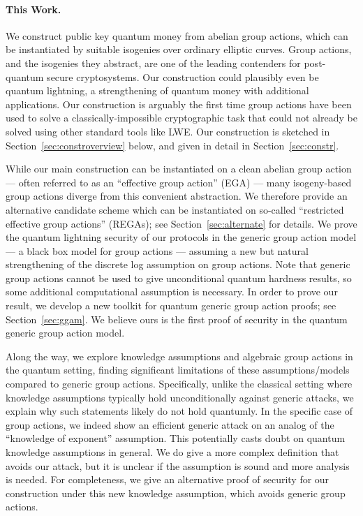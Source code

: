 \documentclass{article}\usepackage[a4paper,margin=20mm]{geometry}
\numberwithin{theorem}{section}
\numberwithin{equation}{section}
\begin{document}
\paragraph{This Work.} We construct public key quantum money from abelian group actions, which can be instantiated by suitable isogenies over ordinary elliptic curves. Group actions, and the isogenies they abstract, are one of the leading contenders for post-quantum secure cryptosystems. Our construction could plausibly even be quantum lightning, a strengthening of quantum money with additional applications. Our construction is arguably the first time group actions have been used to solve a classically-impossible cryptographic task that could not already be solved using other standard tools like LWE. Our construction is sketched in Section~\ref{sec:constroverview} below, and given in detail in Section~\ref{sec:constr}.

While our main construction can be instantiated on a clean abelian group action --- often referred to as an ``effective group action'' (EGA) --- many isogeny-based group actions diverge from this convenient abstraction. We therefore provide an alternative candidate scheme which can be instantiated on so-called ``restricted effective group actions'' (REGAs); see Section~\ref{sec:alternate} for details. We prove the quantum lightning security of our protocols in the generic group action model --- a black box model for group actions --- assuming a new but natural strengthening of the discrete log assumption on group actions. Note that generic group actions cannot be used to give unconditional quantum hardness results, so some additional computational assumption is necessary. In order to prove our result, we develop a new toolkit for quantum generic group action proofs; see Section~\ref{sec:ggam}. We believe ours is the first proof of security in the quantum generic group action model. 

Along the way, we explore knowledge assumptions and algebraic group actions in the quantum setting, finding significant limitations of these assumptions/models compared to generic group actions. Specifically, unlike the classical setting where knowledge assumptions typically hold unconditionally against generic attacks, we explain why such statements likely do not hold quantumly. In the specific case of group actions, we indeed show an efficient generic attack on an analog of the ``knowledge of exponent'' assumption. This potentially casts doubt on quantum knowledge assumptions in general. We do give a more complex definition that avoids our attack, but it is unclear if the assumption is sound and more analysis is needed. For completeness, we give an alternative proof of security for our construction under this new knowledge assumption, which avoids generic group actions. 
\end{document}
